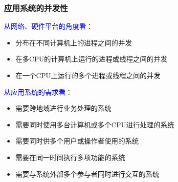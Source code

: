 \documentclass[compress]{beamer}
\begin{document}
\begin{frame}
  \frametitle{应用系统的并发性}
   {
  \textcolor{blue}{ 从网络、硬件平台的角度看}：
  \begin{itemize}
    \item 分布在不同计算机上的进程之间的并发
    \item 在多CPU的计算机上运行的进程或线程之间的并发
    \item 在一个CPU上运行的多个进程或线程之间的并发
  \end{itemize}
}

 {
  \textcolor{blue}{从应用系统的需求看}：
  \begin{itemize}
    \item 需要跨地域进行业务处理的系统
    \item 需要同时使用多台计算机或多个CPU进行处理的系统
    \item 需要同时供多个用户或操作者使用的系统
    \item 需要在同一时间执行多项功能的系统
    \item 需要与系统外部多个参与者同时进行交互的系统
  \end{itemize}
}
\end{frame}
\end{document}
